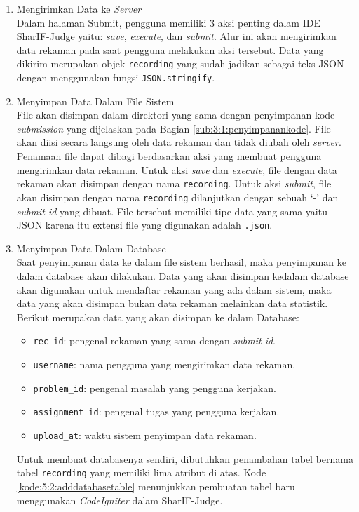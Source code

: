 \begin{enumerate}
    \item Mengirimkan Data ke \textit{Server} \\
    Dalam halaman Submit, pengguna memiliki 3 aksi penting dalam IDE SharIF-Judge yaitu: \textit{save}, \textit{execute}, dan \textit{submit}. Alur ini akan mengirimkan data rekaman pada saat pengguna melakukan aksi tersebut. Data yang dikirim merupakan objek \verb|recording| yang sudah jadikan sebagai teks JSON dengan menggunakan fungsi \verb|JSON.stringify|.

    \item Menyimpan Data Dalam File Sistem \\
    File akan disimpan dalam direktori yang sama dengan penyimpanan kode \textit{submission} yang dijelaskan pada Bagian \ref{sub:3:1:penyimpanankode}. File akan diisi secara langsung oleh data rekaman dan tidak diubah oleh \textit{server}. Penamaan file dapat dibagi berdasarkan aksi yang membuat pengguna mengirimkan data rekaman. Untuk aksi \textit{save} dan \textit{execute}, file dengan data rekaman akan disimpan dengan nama \verb|recording|. Untuk aksi \textit{submit}, file akan disimpan dengan nama \verb|recording| dilanjutkan dengan sebuah `-' dan \textit{submit id} yang dibuat. File tersebut memiliki tipe data yang sama yaitu JSON karena itu extensi file yang digunakan adalah \verb|.json|.
 
    \item Menyimpan Data Dalam Database \\
    Saat penyimpanan data ke dalam file sistem berhasil, maka penyimpanan ke dalam database akan dilakukan. Data yang akan disimpan kedalam database akan digunakan untuk mendaftar rekaman yang ada dalam sistem, maka data yang akan disimpan bukan data rekaman melainkan data statistik. Berikut merupakan data yang akan disimpan ke dalam Database:
    \begin{itemize}
        \item \verb|rec_id|: pengenal rekaman yang sama dengan \textit{submit id}.  
        \item \verb|username|: nama pengguna yang mengirimkan data rekaman.
        \item \verb|problem_id|: pengenal masalah yang pengguna kerjakan.
        \item \verb|assignment_id|: pengenal tugas yang pengguna kerjakan.
        \item \verb|upload_at|: waktu sistem penyimpan data rekaman.
    \end{itemize}
    Untuk membuat databasenya sendiri, dibutuhkan penambahan tabel bernama tabel \verb|recording| yang memiliki lima atribut di atas. Kode \ref{kode:5:2:adddatabasetable} menunjukkan pembuatan tabel baru menggunakan \textit{CodeIgniter} dalam SharIF-Judge.


\end{enumerate}
